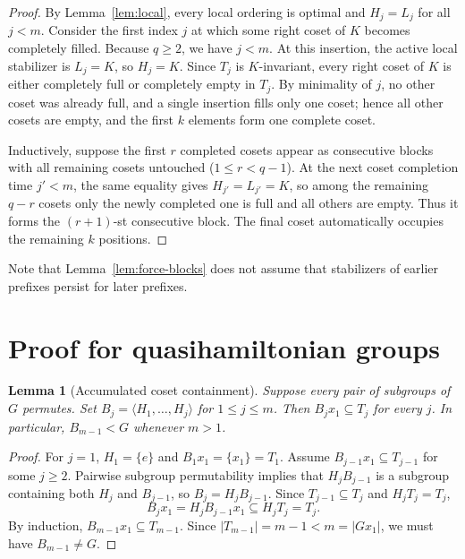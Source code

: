 \documentclass[11pt,reqno]{amsart}
\numberwithin{equation}{section}
\newtheorem{lemma}[theorem]{Lemma}
\theoremstyle{definition}
\theoremstyle{remark}
\begin{document}
\begin{proof}
By Lemma~\ref{lem:local}, every local ordering is optimal and $H_j=L_j$ for all $j<m$. Consider the first index $j$ at which some right coset of $K$ becomes completely filled. Because $q\ge 2$, we have $j<m$. At this insertion, the active local stabilizer is $L_j=K$, so $H_j=K$. Since $T_j$ is $K$-invariant, every right coset of $K$ is either completely full or completely empty in $T_j$. By minimality of $j$, no other coset was already full, and a single insertion fills only one coset; hence all other cosets are empty, and the first $k$ elements form one complete coset.

Inductively, suppose the first $r$ completed cosets appear as consecutive blocks with all remaining cosets untouched ($1\le r<q-1$). At the next coset completion time $j'<m$, the same equality gives $H_{j'}=L_{j'}=K$, so among the remaining $q-r$ cosets only the newly completed one is full and all others are empty. Thus it forms the $(r+1)$-st consecutive block. The final coset automatically occupies the remaining $k$ positions.
\end{proof}

Note that Lemma~\ref{lem:force-blocks} does not assume that stabilizers of earlier prefixes persist for later prefixes.

\section{Proof for quasihamiltonian groups}
\label{sec:quasi}

\begin{lemma}[Accumulated coset containment]
\label{lem:accum}
Suppose every pair of subgroups of $G$ permutes. Set $B_j = \langle H_1,\ldots,H_j\rangle$ for $1\le j\le m$. Then $B_j x_1 \subseteq T_j$ for every $j$. In particular, $B_{m-1} < G$ whenever $m>1$.
\end{lemma}

\begin{proof}
For $j=1$, $H_1=\{e\}$ and $B_1 x_1 = \{x_1\} = T_1$. Assume $B_{j-1}x_1 \subseteq T_{j-1}$ for some $j\ge 2$. Pairwise subgroup permutability implies that $H_j B_{j-1}$ is a subgroup containing both $H_j$ and $B_{j-1}$, so $B_j = H_j B_{j-1}$. Since $T_{j-1}\subseteq T_j$ and $H_j T_j = T_j$,
\[
B_j x_1 = H_j B_{j-1} x_1 \subseteq H_j T_j = T_j.
\]
By induction, $B_{m-1}x_1 \subseteq T_{m-1}$. Since $|T_{m-1}|=m-1<m=|Gx_1|$, we must have $B_{m-1}\neq G$.
\end{proof}
\end{document}

